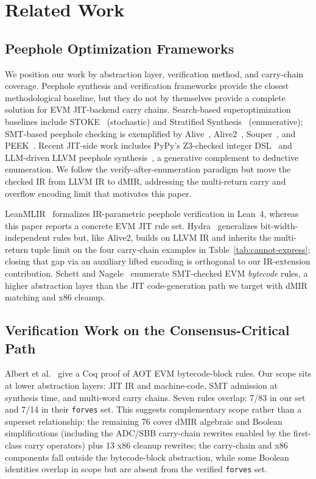 \section{Related Work}
\label{sec:related}

\subsection{Peephole Optimization Frameworks}

{\sloppy
We position our work by abstraction layer, verification method, and
carry-chain coverage. Peephole synthesis and verification frameworks
provide the closest methodological baseline, but they do not by
themselves provide a complete solution for EVM JIT-backend carry
chains. Search-based superoptimization baselines include
STOKE~\cite{stoke} (stochastic) and Stratified
Synthesis~\cite{stratified} (enumerative); SMT-based peephole checking is
exemplified by Alive~\cite{alive}, Alive2~\cite{alive2},
Souper~\cite{souper}, and PEEK~\cite{peek}. Recent JIT-side work
includes PyPy's Z3-checked integer DSL~\cite{pypy_ruleopt} and
LLM-driven LLVM peephole synthesis~\cite{lampo2025}, a generative
complement to deductive enumeration.
We follow the verify-after-enumeration paradigm but move the checked IR
from LLVM IR to dMIR, addressing the multi-return carry and overflow
encoding limit that motivates this paper.\par}

{\sloppy
LeanMLIR~\cite{leanmlir} formalizes IR-parametric peephole verification
in Lean~4, whereas this paper reports a concrete EVM JIT rule set.
Hydra~\cite{hydra} generalizes bit-width-independent rules but, like
Alive2, builds on LLVM IR and inherits the multi-return tuple limit on
the four carry-chain examples in Table~\ref{tab:cannot-express}; closing
that gap via an auxiliary lifted encoding is orthogonal to our
IR-extension contribution. Schett and Nagele~\cite{fmbc20_evm_peephole}
enumerate SMT-checked EVM \emph{bytecode} rules, a higher abstraction
layer than the JIT code-generation path we target with dMIR matching and
x86 cleanup.\par}

\subsection{Verification Work on the Consensus-Critical Path}

Albert et al.~\cite{verified_evm_cav23} give a Coq proof of AOT EVM
bytecode-block rules. Our scope sits at lower abstraction layers: JIT IR
and machine-code, SMT admission at synthesis time, and multi-word carry
chains. Seven rules overlap: 7/83 in our set and 7/14 in their
\texttt{forves} set. This suggests complementary scope rather than a
superset relationship: the remaining 76 cover dMIR algebraic and Boolean
simplifications (including the ADC/SBB carry-chain rewrites enabled by
the first-class carry operators) plus 13 x86 cleanup rewrites; the
carry-chain and x86 components fall outside the bytecode-block
abstraction, while some Boolean identities overlap in scope but are
absent from the verified \texttt{forves} set.

